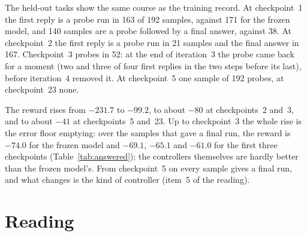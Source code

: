 \documentclass[11pt,a4paper]{article}
\begin{document}
The held-out tasks show the same course as the training record. At
checkpoint~1 the first reply is a probe run in 163 of 192 samples, against
171 for the frozen model, and 140 samples are a probe followed by a final
answer, against 38. At checkpoint~2 the first reply is a probe run in 21
samples and the final answer in 167. Checkpoint~3 probes in 52: at the end
of iteration~3 the probe came back for a moment (two and three of four
first replies in the two steps before its last), before iteration~4 removed
it. At checkpoint~5 one sample of 192 probes, at checkpoint~23 none.

The reward rises from $-231.7$ to $-99.2$, to about $-80$ at checkpoints~2
and~3, and to about $-41$ at checkpoints~5 and~23. Up to checkpoint~3 the
whole rise is the error floor emptying: over the samples that gave a final
run, the reward is $-74.0$ for the frozen model and $-69.1$, $-65.1$ and
$-61.0$ for the first three checkpoints (Table~\ref{tab:answered}); the
controllers themselves are hardly better than the frozen model's. From
checkpoint~5 on every sample gives a final run, and what changes is the kind
of controller (item~5 of the reading).

\begin{table}[h]
\centering\small

\caption{Each run split into the samples that ended without a final run,
which score $-300$, and the rest.}
\label{tab:answered}
\end{table}

\section{Reading}
\end{document}
